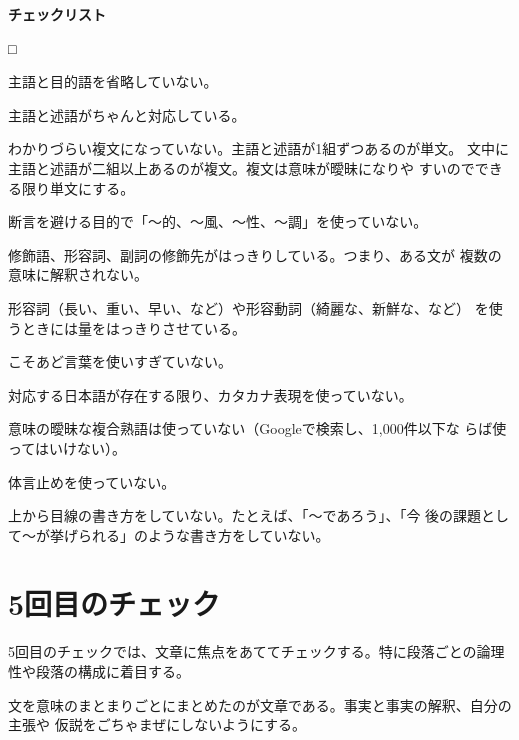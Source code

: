\documentclass[11pt,a4j]{jsarticle}
\begin{document}
\begin{flushleft}
 {\bf チェックリスト}
\end{flushleft}
\begin{list}%
 {□} %
 {} %
 \item 主語と目的語を省略していない。
 \item 主語と述語がちゃんと対応している。
 \item わかりづらい複文になっていない。主語と述語が1組ずつあるのが単文。
       文中に主語と述語が二組以上あるのが複文。複文は意味が曖昧になりや
       すいのでできる限り単文にする。
 \item 断言を避ける目的で「〜的、〜風、〜性、〜調」を使っていない。
 \item 修飾語、形容詞、副詞の修飾先がはっきりしている。つまり、ある文が
       複数の意味に解釈されない。
 \item 形容詞（長い、重い、早い、など）や形容動詞（綺麗な、新鮮な、など）
       を使うときには量をはっきりさせている。
 \item こそあど言葉を使いすぎていない。
 \item 対応する日本語が存在する限り、カタカナ表現を使っていない。
 \item 意味の曖昧な複合熟語は使っていない（Googleで検索し、1,000件以下な
       らば使ってはいけない）。
 \item 体言止めを使っていない。
 \item 上から目線の書き方をしていない。たとえば、「〜であろう」、「今
       後の課題として〜が挙げられる」のような書き方をしていない。
\end{list}

\section{5回目のチェック}

5回目のチェックでは、文章に焦点をあててチェックする。特に段落ごとの論理
性や段落の構成に着目する。

文を意味のまとまりごとにまとめたのが文章である。事実と事実の解釈、自分の主張や
仮説をごちゃまぜにしないようにする。
\end{document}
